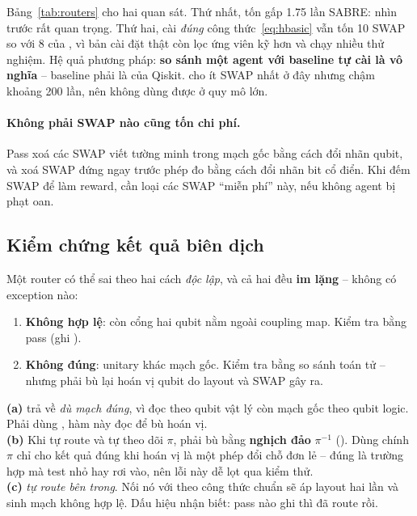 Bảng~\ref{tab:routers} cho hai quan sát. Thứ nhất,  tốn gấp 1.75 lần SABRE: nhìn
trước rất quan trọng. Thứ hai,  cài \emph{đúng} công thức~\eqref{eq:hbasic} vẫn
tốn 10 SWAP so với 8 của , vì bản cài đặt thật còn lọc ứng viên kỹ hơn và chạy
nhiều thử nghiệm. Hệ quả phương pháp: \textbf{so sánh một agent với baseline tự cài là vô nghĩa} --
baseline phải là  của Qiskit.  cho ít SWAP nhất ở đây nhưng chậm
khoảng 200 lần, nên không dùng được ở quy mô lớn.

\paragraph{Không phải SWAP nào cũng tốn chi phí.} Pass  xoá các SWAP viết
tường minh trong mạch gốc bằng cách đổi nhãn qubit, và  xoá SWAP đứng
ngay trước phép đo bằng cách đổi nhãn bit cổ điển. Khi đếm SWAP để làm reward, cần loại các SWAP
``miễn phí'' này, nếu không agent bị phạt oan.

\subsection{Kiểm chứng kết quả biên dịch}
\label{sec:verify}

Một router có thể sai theo hai cách \emph{độc lập}, và cả hai đều \textbf{im lặng} -- không có
exception nào:
\begin{enumerate}[noitemsep]
  \item \textbf{Không hợp lệ}: còn cổng hai qubit nằm ngoài coupling map. Kiểm tra bằng pass
     (ghi ).
  \item \textbf{Không đúng}: unitary khác mạch gốc. Kiểm tra bằng so sánh toán tử -- nhưng phải bù
    lại hoán vị qubit do layout và SWAP gây ra.
\end{enumerate}

\begin{warnbox}
\textbf{(a)}  trả về  \emph{dù mạch đúng},
vì  đọc theo qubit vật lý còn mạch gốc theo qubit logic. Phải dùng
, hàm này đọc  để bù hoán vị.\\[2pt]
\textbf{(b)} Khi tự route và tự theo dõi $\pi$, phải bù bằng \textbf{nghịch đảo} $\pi^{-1}$
(). Dùng chính $\pi$ chỉ cho kết quả đúng khi hoán vị là một phép đổi
chỗ đơn lẻ -- đúng là trường hợp mà test nhỏ hay rơi vào, nên lỗi này dễ lọt qua kiểm thử.\\[2pt]
\textbf{(c)}  \emph{tự route bên trong}. Nối nó với  theo công
thức chuẩn sẽ áp layout hai lần và sinh mạch không hợp lệ. Dấu hiệu nhận biết: pass nào ghi
 thì đã route rồi.
\end{warnbox}

